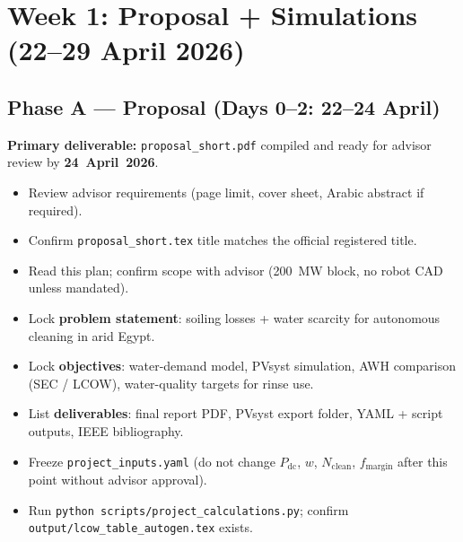 \documentclass[11pt,a4paper]{article}
\begin{document}
\section{Week 1: Proposal + Simulations (22--29 April 2026)}

\subsection*{Phase A --- Proposal (Days 0--2: 22--24 April)}
\textbf{Primary deliverable:} \texttt{proposal\_short.pdf} compiled and ready for advisor review by \textbf{24~April~2026}.

\begin{description}[style=nextline,leftmargin=2cm,font=\normalfont\bfseries]
  \item[Day~0 \textnormal{(Wed 22 Apr)}]
  \begin{itemize}[nosep]
    \item Review advisor requirements (page limit, cover sheet, Arabic abstract if required).
    \item Confirm \texttt{proposal\_short.tex} title matches the official registered title.
    \item Read this plan; confirm scope with advisor (200~MW block, no robot CAD unless mandated).
  \end{itemize}

  \item[Day~1 \textnormal{(Thu 23 Apr)}]
  \begin{itemize}[nosep]
    \item Lock \textbf{problem statement}: soiling losses + water scarcity for autonomous cleaning in arid Egypt.
    \item Lock \textbf{objectives}: water-demand model, PVsyst simulation, AWH comparison (SEC / LCOW), water-quality targets for rinse use.
    \item List \textbf{deliverables}: final report PDF, PVsyst export folder, YAML + script outputs, IEEE bibliography.
    \item Freeze \texttt{project\_inputs.yaml} (do not change $P_{\mathrm{dc}}$, $w$, $N_{\mathrm{clean}}$, $f_{\mathrm{margin}}$ after this point without advisor approval).
    \item Run \texttt{python scripts/project\_calculations.py}; confirm \texttt{output/lcow\_table\_autogen.tex} exists.
  \end{itemize}


\end{description}
\end{document}
